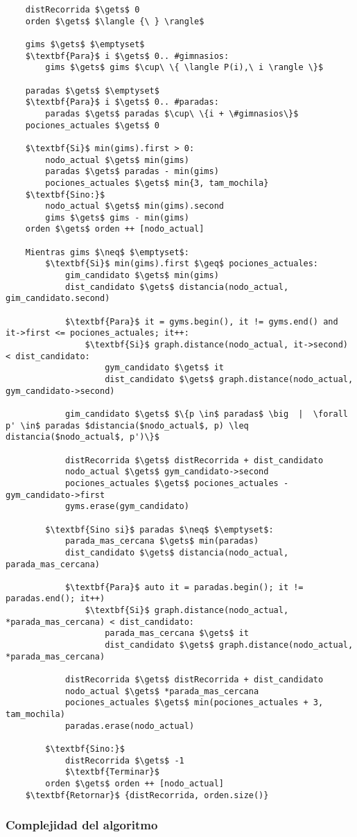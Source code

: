     \begin{lstlisting}
    distRecorrida $\gets$ 0
    orden $\gets$ $\langle {\ } \rangle$

    gims $\gets$ $\emptyset$
    $\textbf{Para}$ i $\gets$ 0.. #gimnasios:
        gims $\gets$ gims $\cup\ \{ \langle P(i),\ i \rangle \}$

    paradas $\gets$ $\emptyset$
    $\textbf{Para}$ i $\gets$ 0.. #paradas:
        paradas $\gets$ paradas $\cup\ \{i + \#gimnasios\}$
    pociones_actuales $\gets$ 0

    $\textbf{Si}$ min(gims).first > 0:
        nodo_actual $\gets$ min(gims)
        paradas $\gets$ paradas - min(gims)
        pociones_actuales $\gets$ min{3, tam_mochila}
    $\textbf{Sino:}$
        nodo_actual $\gets$ min(gims).second
        gims $\gets$ gims - min(gims)
    orden $\gets$ orden ++ [nodo_actual]

    Mientras gims $\neq$ $\emptyset$:
        $\textbf{Si}$ min(gims).first $\geq$ pociones_actuales:
            gim_candidato $\gets$ min(gims)
            dist_candidato $\gets$ distancia(nodo_actual, gim_candidato.second)

            $\textbf{Para}$ it = gyms.begin(), it != gyms.end() and it->first <= pociones_actuales; it++:
                $\textbf{Si}$ graph.distance(nodo_actual, it->second) < dist_candidato:
                    gym_candidato $\gets$ it
                    dist_candidato $\gets$ graph.distance(nodo_actual, gym_candidato->second)

            gim_candidato $\gets$ $\{p \in$ paradas$ \big  |  \forall p' \in$ paradas $distancia($nodo_actual$, p) \leq distancia($nodo_actual$, p')\}$

            distRecorrida $\gets$ distRecorrida + dist_candidato
            nodo_actual $\gets$ gym_candidato->second
            pociones_actuales $\gets$ pociones_actuales - gym_candidato->first
            gyms.erase(gym_candidato)

        $\textbf{Sino si}$ paradas $\neq$ $\emptyset$:
            parada_mas_cercana $\gets$ min(paradas)
            dist_candidato $\gets$ distancia(nodo_actual, parada_mas_cercana)

            $\textbf{Para}$ auto it = paradas.begin(); it != paradas.end(); it++)
                $\textbf{Si}$ graph.distance(nodo_actual, *parada_mas_cercana) < dist_candidato:
                    parada_mas_cercana $\gets$ it
                    dist_candidato $\gets$ graph.distance(nodo_actual, *parada_mas_cercana)

            distRecorrida $\gets$ distRecorrida + dist_candidato
            nodo_actual $\gets$ *parada_mas_cercana
            pociones_actuales $\gets$ min(pociones_actuales + 3, tam_mochila)
            paradas.erase(nodo_actual)

        $\textbf{Sino:}$
            distRecorrida $\gets$ -1
            $\textbf{Terminar}$
        orden $\gets$ orden ++ [nodo_actual]
    $\textbf{Retornar}$ {distRecorrida, orden.size()}
    \end{lstlisting}

\subsubsection{Complejidad del algoritmo}
